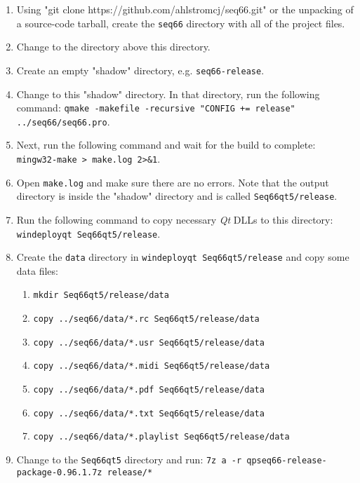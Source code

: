    \begin{enumerate}
      \item Using
         "git clone https://github.com/ahlstromcj/seq66.git"
         or the unpacking of a source-code tarball,
         create the \texttt{seq66} directory with all
         of the project files.
      \item Change to the directory above this directory.
      \item Create an empty "shadow" directory, e.g. \texttt{seq66-release}.
      \item Change to this "shadow" directory.  In that directory, run the
         following command:
         \texttt{qmake -makefile -recursive "CONFIG += release"
            ../seq66/seq66.pro}.
      \item Next, run the following command and wait for the build to
         complete:
         \texttt{mingw32-make > make.log 2>\&1}.
      \item Open \texttt{make.log} and make sure there are no errors.
         Note that the output directory is inside the "shadow" directory and
         is called \texttt{Seq66qt5/release}.
      \item Run the following command to copy necessary \textsl{Qt} DLLs to
         this directory: \linebreak
         \texttt{windeployqt Seq66qt5/release}.
      \item Create the \texttt{data} directory in
         \texttt{windeployqt Seq66qt5/release} and copy some data files:
         \begin{enumerate}
            \item \texttt{mkdir Seq66qt5/release/data}
            \item \texttt{copy ../seq66/data/*.rc Seq66qt5/release/data}
            \item \texttt{copy ../seq66/data/*.usr Seq66qt5/release/data}
            \item \texttt{copy ../seq66/data/*.midi Seq66qt5/release/data}
            \item \texttt{copy ../seq66/data/*.pdf Seq66qt5/release/data}
            \item \texttt{copy ../seq66/data/*.txt Seq66qt5/release/data}
            \item \texttt{copy ../seq66/data/*.playlist Seq66qt5/release/data}
         \end{enumerate}
      \item Change to the \texttt{Seq66qt5} directory and run:
         \texttt{7z a -r qpseq66-release-package-0.96.1.7z \linebreak release/*}
   \end{enumerate}

